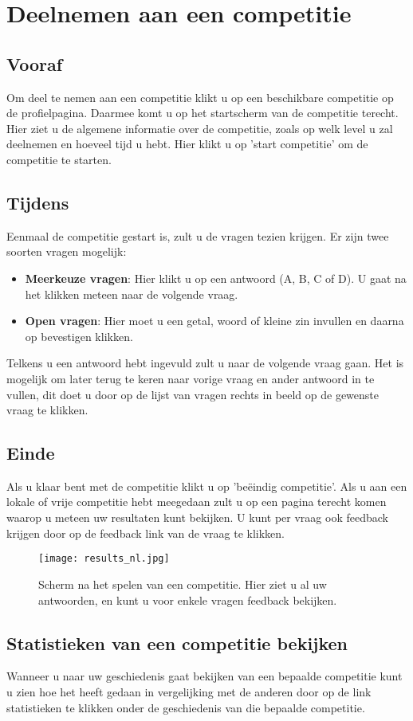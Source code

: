 \documentclass[11pt,a4paper]{report}
\begin{document}
\section{Deelnemen aan een competitie}
\subsection{Vooraf}
Om deel te nemen aan een competitie klikt u op een beschikbare competitie op de profielpagina. Daarmee komt u op het startscherm van de competitie terecht. Hier ziet u de algemene informatie over de competitie, zoals op welk level u zal deelnemen en hoeveel tijd u hebt. Hier klikt u op 'start competitie' om de competitie te starten.
\subsection{Tijdens}
Eenmaal de competitie gestart is, zult u de vragen tezien krijgen. Er zijn twee soorten vragen mogelijk:
\begin{itemize}
\item \textbf{Meerkeuze vragen}: Hier klikt u op een antwoord (A, B, C of D). U gaat na het klikken meteen naar de volgende vraag. 
\item \textbf{Open vragen}: Hier moet u een getal, woord of kleine zin invullen en daarna op bevestigen klikken.
\end{itemize}
Telkens u een antwoord hebt ingevuld zult u naar de volgende vraag gaan. Het is mogelijk om later terug te keren naar vorige vraag en ander antwoord in te vullen, dit doet u door op de lijst van vragen rechts in beeld op de gewenste vraag te klikken.
\subsection{Einde}
Als u klaar bent met de competitie klikt u op 'be\"eindig competitie'. Als u aan een lokale of vrije competitie hebt meegedaan zult u op een pagina terecht komen waarop u meteen uw resultaten kunt bekijken. U kunt per vraag ook feedback krijgen door op de feedback link van de vraag te klikken.

\begin{figure}[h!]
\centering
\texttt{[image: results\_nl.jpg]}
\caption{Scherm na het spelen van een competitie. Hier ziet u al uw antwoorden, en kunt u voor enkele vragen feedback bekijken.}
\label{fig:results}
\end{figure}

\subsection{Statistieken van een competitie bekijken}
Wanneer u naar uw geschiedenis gaat bekijken van een bepaalde competitie kunt u zien hoe het heeft gedaan in vergelijking met de anderen door op de link statistieken te klikken onder de geschiedenis van die bepaalde competitie.
\end{document}
